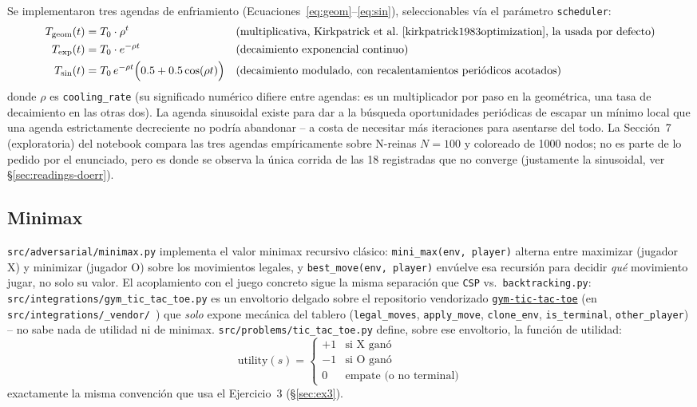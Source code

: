 \documentclass[11pt,onecolumn,letterpaper]{article}
\newcommand{\code}[1]{\texttt{#1}}
\begin{document}
Se implementaron tres agendas de enfriamiento (Ecuaciones~\ref{eq:geom}--\ref{eq:sin}),
seleccionables v\'ia el par\'ametro \code{scheduler}:
\begin{align}
T_{\text{geom}}(t) &= T_0 \cdot \rho^{t} &&\text{(multiplicativa, Kirkpatrick et al.~\cite{kirkpatrick1983optimization}, la usada por defecto)}\label{eq:geom}\\
T_{\text{exp}}(t) &= T_0 \cdot e^{-\rho t} &&\text{(decaimiento exponencial continuo)}\label{eq:exp}\\
T_{\text{sin}}(t) &= T_0\, e^{-\rho t}\Big(0.5+0.5\cos(\rho t)\Big) &&\text{(decaimiento modulado, con recalentamientos peri\'odicos acotados)}\label{eq:sin}
\end{align}
donde $\rho$ es \code{cooling\_rate} (su significado num\'erico difiere entre agendas: es un
multiplicador por paso en la geom\'etrica, una tasa de decaimiento en las otras dos). La
agenda sinusoidal existe para dar a la b\'usqueda oportunidades peri\'odicas de escapar un
m\'inimo local que una agenda estrictamente decreciente no podr\'ia abandonar -- a costa de
necesitar m\'as iteraciones para asentarse del todo. La Secci\'on~7 (exploratoria) del
notebook compara las tres agendas emp\'iricamente sobre N-reinas $N=100$ y coloreado de
1000 nodos; no es parte de lo pedido por el enunciado, pero es donde se observa la
\'unica corrida de las 18 registradas que no converge (justamente la sinusoidal, ver
\S\ref{sec:readings-doerr}).

\subsection{Minimax}
\label{sec:impl-minimax}

\code{src/adversarial/minimax.py} implementa el valor minimax recursivo cl\'asico:
\code{mini\_max(env, player)} alterna entre maximizar (jugador X) y minimizar (jugador O)
sobre los movimientos legales, y \code{best\_move(env, player)} env\'uelve esa recursi\'on
para decidir \emph{qu\'e} movimiento jugar, no solo su valor. El acoplamiento con el juego
concreto sigue la misma separaci\'on que \code{CSP} vs.\ \code{backtracking.py}:
\code{src/integrations/gym\_tic\_tac\_toe.py} es un envoltorio delgado sobre el repositorio
vendorizado \href{https://github.com/LudwigStumpp/gym-tic-tac-toe}{\code{gym-tic-tac-toe}}
(en \code{src/integrations/\_vendor/}~\cite{gymtictactoe}) que \emph{solo} expone
mec\'anica del tablero (\code{legal\_moves}, \code{apply\_move}, \code{clone\_env},
\code{is\_terminal}, \code{other\_player}) -- no sabe nada de utilidad ni de minimax.
\code{src/problems/tic\_tac\_toe.py} define, sobre ese envoltorio, la funci\'on de utilidad:
\begin{equation}
\text{utility}(s) = \begin{cases} +1 & \text{si X gan\'o} \\ -1 & \text{si O gan\'o} \\ 0 & \text{empate (o no terminal)}\end{cases}
\end{equation}
exactamente la misma convenci\'on que usa el Ejercicio~3 (\S\ref{sec:ex3}).
\end{document}
